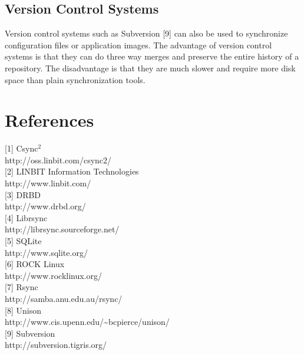 \documentclass[a4paper,twocolumn]{article}
\def\csync2{{\sc Csync$^{2}$}}
\begin{document}
\subsection{Version Control Systems}

Version control systems such as Subversion [9] can also be used to synchronize
configuration files or application images. The advantage of version control
systems is that they can do three way merges and preserve the entire history
of a repository. The disadvantage is that they are much slower and require more
disk space than plain synchronization tools.

\section{References}

{[1]} \csync2 \\
http://oss.linbit.com/csync2/
\medskip \\
{[2]} LINBIT Information Technologies \\
http://www.linbit.com/
\medskip \\
{[3]} DRBD \\
http://www.drbd.org/
\medskip \\
{[4]} Librsync \\
http://librsync.sourceforge.net/
\medskip \\
{[5]} SQLite \\
http://www.sqlite.org/
\medskip \\
{[6]} ROCK Linux \\
http://www.rocklinux.org/
\medskip \\
{[7]} Rsync \\
http://samba.anu.edu.au/rsync/
\medskip \\
{[8]} Unison \\
http://www.cis.upenn.edu/\textasciitilde{}bcpierce/unison/
\medskip \\
{[9]} Subversion \\
http://subversion.tigris.org/
\end{document}
